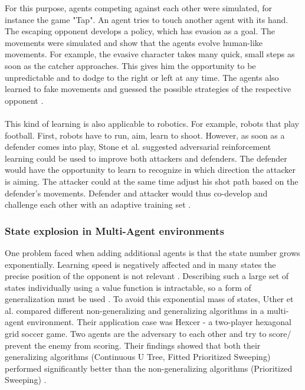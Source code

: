 For this purpose, agents competing against each other were simulated, for instance the game "Tap". An agent tries to touch another agent with its hand. The escaping opponent develops a policy, which has evasion as a goal.
The movements were simulated and show that the agents evolve human-like movements. For example, the evasive character takes many quick, small steps as soon as the catcher approaches. This gives him the opportunity to be unpredictable and to dodge to the right or left at any time.
The agents also learned to fake movements and guessed the possible strategies of the respective opponent \cite{animationwampler2010character}. \\
\\
This kind of learning is also applicable to robotics. For example, robots that play football. First, robots have to run, aim, learn to shoot. However, as soon as a defender comes into play, Stone et al. \cite{roboticstone1998towards} suggested adversarial reinforcement learning could be used to improve both attackers and defenders. The defender would have the opportunity to learn to recognize in which direction the attacker is aiming. The attacker could at the same time adjust his shot path based on the defender's movements. 
Defender and attacker would thus co-develop and challenge each other with an adaptive training set \cite{roboticstone1998towards}.

\subsubsection{State explosion in Multi-Agent environments}

One problem faced when adding additional agents is that the state number grows exponentially. Learning speed is negatively affected and in many states the precise position of the opponent is not relevant \cite{multiuther1997generalizing}.
Describing such a large set of states individually using a value function is intractable, so a form of generalization must be used \cite{boyan1995generalization}. 
To avoid this exponential mass of states, Uther et al. \cite{multiuther1997generalizing} compared different non-generalizing and generalizing algorithms in a multi-agent environment. 
Their application case was Hexcer - a two-player hexagonal grid soccer game. Two agents are the adversary to each other and try to score/ prevent the enemy from scoring. Their findings showed that both their generalizing algorithms (Continuous U Tree, Fitted Prioritized Sweeping) performed significantly better than the non-generalizing algorithms (Prioritized Sweeping) \cite{multiuther1997generalizing}.
